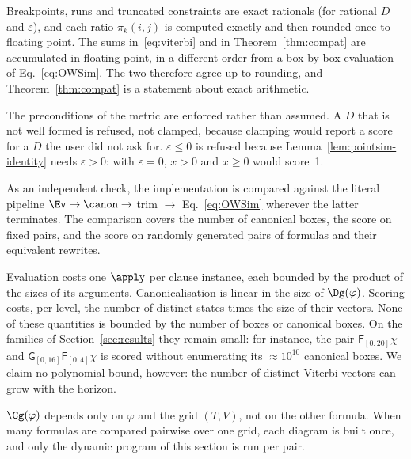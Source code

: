 \begin{remark}\label{rem:impl}
Breakpoints, runs and truncated constraints are exact rationals (for rational
$D$ and $\varepsilon$), and each ratio $\pi_k(i,j)$ is computed exactly and
then rounded once to floating point. The sums in~\eqref{eq:viterbi} and in
Theorem~\ref{thm:compat} are accumulated in floating point, in a different
order from a box-by-box evaluation of Eq.~\eqref{eq:OWSim}. The two therefore
agree up to rounding, and Theorem~\ref{thm:compat} is a statement about exact
arithmetic.

The preconditions of the metric are enforced rather than assumed. A $D$ that is
not well formed is refused, not clamped, because clamping would report a score
for a $D$ the user did not ask for. $\varepsilon\le0$ is refused because
Lemma~\ref{lem:pointsim-identity} needs $\varepsilon>0$: with $\varepsilon=0$,
$x>0$ and $x\ge0$ would score~1.

As an independent check, the implementation is compared against the literal
pipeline $\Ev\to\canon\to$ trim $\to$ Eq.~\eqref{eq:OWSim} wherever the latter
terminates. The comparison covers the number of canonical boxes, the score on
fixed pairs, and the score on randomly generated pairs of formulas and their
equivalent rewrites.
\end{remark}

\begin{remark}[cost]\label{rem:cost}
Evaluation costs one $\apply$ per clause instance, each bounded by the product
of the sizes of its arguments. Canonicalisation is linear in the size of
$\Dg(\varphi)$. Scoring costs, per level, the number of distinct states times
the size of their vectors. None of these quantities is bounded by the number of
boxes or canonical boxes. On the families of Section~\ref{sec:results}
they remain small: for instance, the pair
$\mathsf{F}_{[0,20]}\chi$ and $\mathsf{G}_{[0,16]}\mathsf{F}_{[0,4]}\chi$ is scored
without enumerating its $\approx10^{10}$ canonical boxes. We claim no
polynomial bound, however: the number of distinct Viterbi vectors can grow
with the horizon.
\end{remark}

\begin{remark}
$\Cg(\varphi)$ depends only on $\varphi$ and the grid $(T,V)$, not on the other
formula. When many formulas are compared pairwise over one grid, each diagram
is built once, and only the dynamic program of this section is run per pair.
\end{remark}
